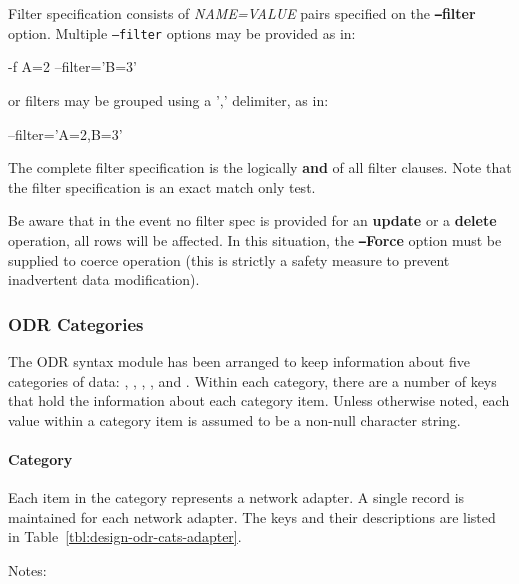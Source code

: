 Filter specification consists of {\em NAME=VALUE\/} pairs specified on the {\bf {\tt --}filter} option.
Multiple {\tt --filter} options may be provided as in:

-f A=2 --filter='B=3'

or filters may be grouped using a ',' delimiter, as in:

--filter='A=2,B=3'

The complete filter specification is the logically {\bf and} of all filter clauses. Note
that the filter specification is an exact match only test.

Be aware that in the event no filter spec is provided for an {\bf update} or a {\bf delete}
operation, all rows will be affected. In this situation, the {\bf {\tt --}Force} option must
be supplied to coerce operation (this is strictly a safety measure to prevent
inadvertent data modification).

\subsubsection{ODR Categories}

The ODR syntax module has been arranged to keep information about five
categories of data: , ,
, , and 
. Within each category, there are a number of keys 
that hold the information about each category item. Unless otherwise
noted, each value within a category item is assumed to be a non-null
character string.


\paragraph{ Category}

Each item in the  category represents a network
adapter. A single record is maintained for each network adapter.  The
keys and their descriptions are listed in
Table~\ref{tbl:design-odr-cats-adapter}.

Notes:

